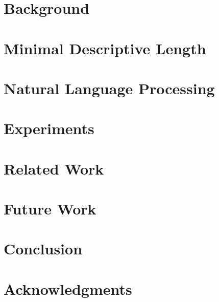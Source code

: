 \documentclass{sig-alternate-05-2015}
\begin{document}
\section{Background}


\section{Minimal Descriptive Length}


\section{Natural Language Processing}


\section{Experiments}


\section{Related Work}


\section{Future Work}


\section{Conclusion}


\section{Acknowledgments}


%

%
%

\end{document}
